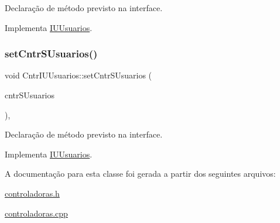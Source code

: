 Declaração de método previsto na interface. 

Implementa \hyperlink{class_i_u_usuarios_a4d18185b92e3672ffe4f2c86c158f297}{I\+U\+Usuarios}.

\mbox{\label{class_cntr_i_u_usuarios_adf37aa596e2e079a281179d04914631d}} 
\subsubsection{\texorpdfstring{set\+Cntr\+S\+Usuarios()}{setCntrSUsuarios()}}
{\footnotesize\ttfamily void Cntr\+I\+U\+Usuarios\+::set\+Cntr\+S\+Usuarios (\begin{DoxyParamCaption}\item[{\hyperlink{class_i_s_usuarios}{I\+S\+Usuarios} $\ast$}]{cntr\+S\+Usuarios }\end{DoxyParamCaption})\hspace{0.3cm}{\ttfamily [inline]}, {\ttfamily [virtual]}}

Declaração de método previsto na interface. 

Implementa \hyperlink{class_i_u_usuarios_adbf1d748cb34a6b568cb2d84d8317696}{I\+U\+Usuarios}.



A documentação para esta classe foi gerada a partir dos seguintes arquivos\+:\begin{DoxyCompactItemize}
\item 
\hyperlink{controladoras_8h}{controladoras.\+h}\item 
\hyperlink{controladoras_8cpp}{controladoras.\+cpp}\end{DoxyCompactItemize}
